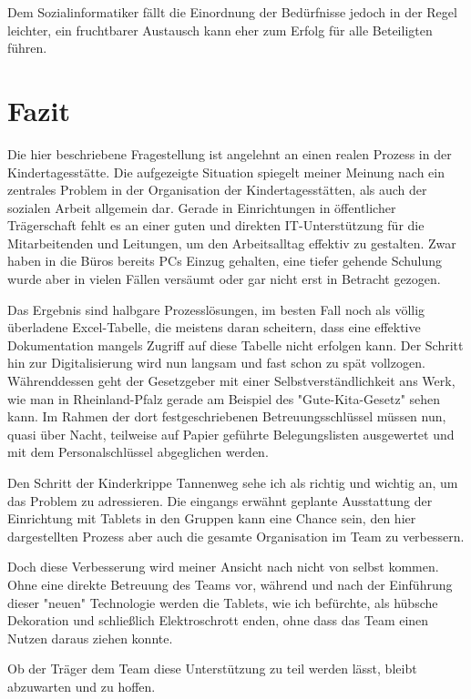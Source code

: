 Dem Sozialinformatiker fällt die Einordnung der Bedürfnisse jedoch in der Regel leichter, ein fruchtbarer Austausch kann eher zum Erfolg für alle Beteiligten führen.

\newpage
\section{Fazit}

Die hier beschriebene Fragestellung ist angelehnt an einen realen Prozess in der Kindertagesstätte.
Die aufgezeigte Situation spiegelt meiner Meinung nach ein zentrales Problem in der Organisation der Kindertagesstätten, als auch der sozialen Arbeit allgemein dar. 
Gerade in Einrichtungen in öffentlicher Trägerschaft fehlt es an einer guten und direkten IT-Unterstützung für die Mitarbeitenden und Leitungen, um den Arbeitsalltag effektiv zu gestalten.
Zwar haben in die Büros bereits PCs Einzug gehalten, eine tiefer gehende Schulung wurde aber in vielen Fällen versäumt oder gar nicht erst in Betracht gezogen. 

Das Ergebnis sind halbgare Prozesslösungen, im besten Fall noch als völlig überladene Excel-Tabelle, die meistens daran scheitern, dass eine effektive Dokumentation mangels Zugriff auf diese Tabelle nicht erfolgen kann.
Der Schritt hin zur Digitalisierung wird nun langsam und fast schon zu spät vollzogen.
Währenddessen geht der Gesetzgeber mit einer Selbstverständlichkeit ans Werk, wie man in Rheinland-Pfalz gerade am Beispiel des "{}Gute-Kita-Gesetz"{} sehen kann. Im Rahmen der dort festgeschriebenen Betreuungsschlüssel müssen nun, quasi über Nacht, teilweise auf Papier geführte Belegungslisten ausgewertet und mit dem Personalschlüssel abgeglichen werden.

Den Schritt der Kinderkrippe Tannenweg sehe ich als richtig und wichtig an, um das Problem zu adressieren. Die eingangs erwähnt geplante Ausstattung der Einrichtung mit Tablets in den Gruppen kann eine Chance sein, den hier dargestellten Prozess aber auch die gesamte Organisation im Team zu verbessern.

Doch diese Verbesserung wird meiner Ansicht nach nicht von selbst kommen. Ohne eine direkte Betreuung des Teams vor, während und nach der Einführung dieser "{}neuen"{} Technologie werden die Tablets, wie ich befürchte, als hübsche Dekoration und schließlich Elektroschrott enden, ohne dass das Team einen Nutzen daraus ziehen konnte.

Ob der Träger dem Team diese Unterstützung zu teil werden lässt, bleibt abzuwarten und zu hoffen.